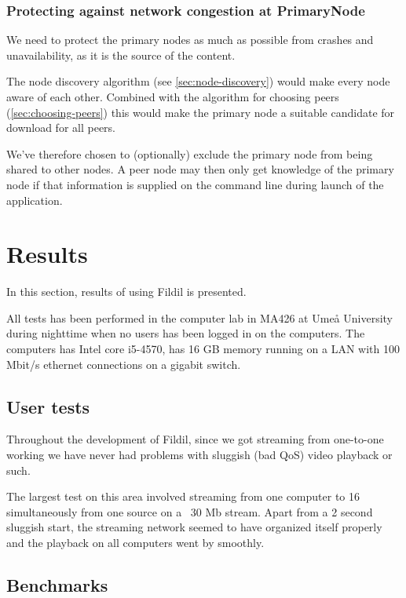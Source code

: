 \documentclass[10pt, a4paper]{article}
\begin{document}
\subsubsection{Protecting against network congestion at PrimaryNode}

We need to protect the primary nodes as much as possible from crashes and
unavailability, as it is the source of the content.

The node discovery algorithm (see \autoref{sec:node-discovery}) would make every
node aware of each other. Combined with the algorithm for choosing peers
(\autoref{sec:choosing-peers}) this would make the primary node a suitable
candidate for download for all peers.

We've therefore chosen to (optionally) exclude the primary node from being
shared to other nodes. A peer node may then only get knowledge of the primary
node if that information is supplied on the command line during launch of the
application.

\section{Results}
\label{sec:results}

In this section, results of using Fildil is presented.

All tests has been performed in the computer lab in MA426 at Umeå University
during nighttime when no users has been logged in on the computers. The
computers has Intel core i5-4570, has 16 GB memory running on a LAN with 100
Mbit/s ethernet connections on a gigabit switch.


\subsection{User tests}

Throughout the development of Fildil, since we got streaming from one-to-one
working we have never had problems with sluggish (bad QoS) video playback or
such.

The largest test on this area involved streaming from one computer to 16
simultaneously from one source on a ~30 Mb stream. Apart from a 2 second
sluggish start, the streaming network seemed to have organized itself properly
and the playback on all computers went by smoothly.

\subsection{Benchmarks}
\label{sec:benchmarks}
\end{document}
